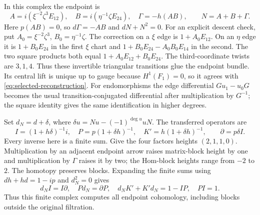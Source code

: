\documentclass[11pt]{amsart}
\theoremstyle{definition}
\theoremstyle{remark}
\begin{document}
In this complex the endpoint is
\begin{equation}\label{eq:cech-endpoint}
 A=i(\xi^{-2}\zeta^3E_{12}),\quad
 B=i(\eta^{-1}\zeta E_{24}),\quad
 \Gamma=-h(AB),\qquad N=A+B+\Gamma.
\end{equation}
Here $p(AB)=0$, so $d\Gamma=-AB$ and $dN+N^2=0$.
For an explicit descent check, put $A_0=\xi^{-2}\zeta^3$,
$B_0=\eta^{-1}\zeta$. The correction on a $\xi$ edge is
$1+A_0E_{12}$. On an $\eta$ edge it is $1+B_0E_{24}$ in the
first $\xi$ chart and $1+B_0E_{24}-A_0B_0E_{14}$ in the second.
The two square products both equal $1+A_0E_{12}+B_0E_{24}$.
The third-coordinate twists are $3,1,4$. Thus these invertible
triangular transitions glue the endpoint bundle. Its central lift is
unique up to gauge because $H^1(F_1)=0$, so it agrees with
\eqref{eq:selected-reconstruction}.
For endomorphisms the edge differential $Gu_1-u_0G$ becomes the
usual transition-conjugated differential after multiplication by $G^{-1}$;
the square identity gives the same identification in higher degrees.

Set $d_N=d+\delta$, where
$\delta u=Nu-(-1)^{\deg u}uN$. The transferred operators are
\begin{equation}\label{eq:finite-transfer}
 I=(1+h\delta)^{-1}i,\quad P=p(1+\delta h)^{-1},\quad
 K'=h(1+\delta h)^{-1},\qquad \partial=p\delta I.
\end{equation}
Every inverse here is a finite sum. Give the four factors heights
$(2,1,1,0)$. Multiplication by an adjacent endpoint arrow raises
matrix-block height by one and multiplication by $\Gamma$ raises it
by two; the Hom-block heights range from $-2$ to $2$.
The homotopy preserves blocks. Expanding the finite sums using
$dh+hd=1-ip$ and $d_N^2=0$ gives
\[
 d_NI=I\partial,\quad Pd_N=\partial P,\quad
 d_NK'+K'd_N=1-IP,\quad PI=1.
\]
Thus this finite complex computes all endpoint cohomology, including
blocks outside the original filtration.
\end{document}
